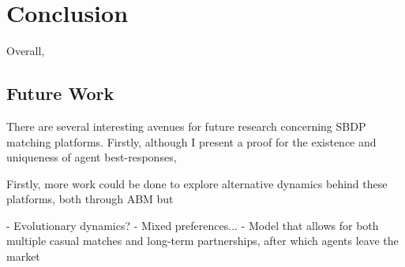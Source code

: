\section{Conclusion}
\label{sec:section5}
Overall,  

\subsection{Future Work}
There are several interesting avenues for future research concerning SBDP matching platforms. Firstly, although I present a proof for the existence and uniqueness of agent best-responses, 

Firstly, more work could be done to explore alternative dynamics behind these platforms, both through ABM but

- Evolutionary dynamics?
- Mixed preferences...
- Model that allows for both multiple casual matches and  long-term partnerships, after which agents leave the market